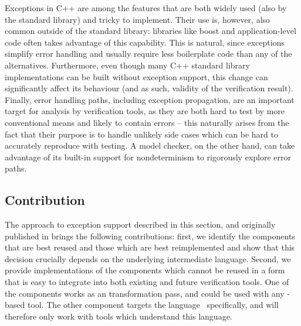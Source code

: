 Exceptions in C++ are among the features that are both widely used (also by the standard library) and tricky to implement.
Their use is, however, also common outside of the standard library: libraries
like boost
and application-level code often takes advantage of this capability.
This is natural, since exceptions simplify error handling and usually require
less boilerplate code than any of the alternatives.
Furthermore, even though many C++ standard library implementations can
be built without exception support, this change can significantly affect its behaviour
(and as such, validity of the verification result).
Finally, error handling paths, including exception propagation, are an
important target for analysis by verification tools, as they are both hard to
test by more conventional means and likely to contain errors -- this naturally
arises from the fact that their purpose is to handle unlikely side cases which
can be hard to accurately reproduce with testing.
A model checker, on the other hand, can take advantage of its built-in support
for nondeterminism to rigorously explore error paths.

\subsection{Contribution}\label{contribution}

The approach to exception support described in this section, and originally published in  brings the following contributions:
first, we identify the
components that are best reused and those which are best reimplemented
and show that this decision crucially depends on the underlying
intermediate language. Second, we provide implementations of the
components which cannot be reused in a form that is easy to integrate
into both existing and future verification tools. One of the components
works as an \llvm{} transformation pass, and could be used with any
\llvm{}-based tool. The other component targets the \divm{}
language~ specifically, and will therefore only
work with tools which understand this language.

